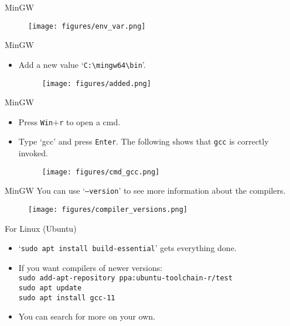 \documentclass{beamer}
\begin{document}
\begin{frame}{MinGW}
    \begin{figure}[h]
        \centering
        \texttt{[image: figures/env\_var.png]}
    \end{figure}
\end{frame}

\begin{frame}{MinGW}
    \begin{itemize}
        \item Add a new value `\texttt{C:\textbackslash mingw64\textbackslash bin}'.
        \begin{figure}[h]
            \centering
            \texttt{[image: figures/added.png]}
        \end{figure}
    \end{itemize}
\end{frame}

\begin{frame}{MinGW}
    \begin{itemize}
        \item Press \texttt{Win}\(+\)\texttt{r} to open a cmd.
        \item Type `gcc' and press \texttt{Enter}. The following shows that \texttt{gcc} is correctly invoked.
        \begin{figure}[h]
            \centering
            \texttt{[image: figures/cmd\_gcc.png]}
        \end{figure}
    \end{itemize}
\end{frame}

\begin{frame}{MinGW}
    You can use `\texttt{--version}' to see more information about the compilers.
    \begin{figure}[h]
        \centering
        \texttt{[image: figures/compiler\_versions.png]}
    \end{figure}
\end{frame}

\begin{frame}{For Linux (Ubuntu)}
    \begin{itemize}
        \item `\texttt{sudo apt install build-essential}' gets everything done.
        \item If you want compilers of newer versions:\\
        \texttt{sudo add-apt-repository ppa:ubuntu-toolchain-r/test}\\
        \texttt{sudo apt update}\\
        \texttt{sudo apt install gcc-11}
        \item You can search for more on your own.
    \end{itemize}
\end{frame}
\end{document}
